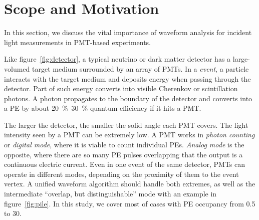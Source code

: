 \section{Scope and Motivation}
\label{sec:toyMC}

In this section, we discuss the vital importance of waveform analysis for incident light measurements in PMT-based experiments.

Like figure~\ref{fig:detector}, a typical neutrino or dark matter detector has a large-volumed target medium surrounded by an array of PMTs. In a \textit{event}, a particle interacts with the target medium and deposits energy when passing through the detector. Part of such energy converts into visible Cherenkov or scintillation photons. A photon propagates to the boundary of the detector and converts into a PE by about \SIrange{20}{30}{\percent} quantum efficiency if it hits a PMT.

The larger the detector, the smaller the solid angle each PMT covers.  The light intensity seen by a PMT can be extremely low.  A PMT works in \textit{photon counting} or \textit{digital mode}, where it is viable to count individual PEs.  \textit{Analog mode} is the opposite, where there are so many PE pulses overlapping that the output is a continuous electric current.  Even in one event of the same detector, PMTs can operate in different modes, depending on the proximity of them to the event vertex.  A unified waveform algorithm should handle both extremes, as well as the intermediate ``overlap, but distinguishable'' mode with an example in figure~\ref{fig:pile}.  In this study,  we cover most of cases with PE occupancy from 0.5 to 30.


